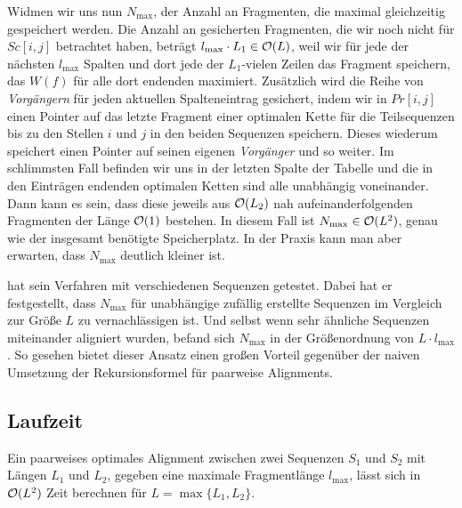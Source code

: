 Widmen wir uns nun $N_{\max}$, der Anzahl an Fragmenten, die maximal gleichzeitig gespeichert werden. Die Anzahl an gesicherten Fragmenten, die wir noch nicht für $Sc[i,j]$ betrachtet haben, beträgt $l_{\max} \cdot L_1 \in \mathcal{O}(L)$, weil wir für jede der nächsten $l_{\max}$ Spalten und dort jede der $L_1$-vielen Zeilen das Fragment speichern, das $W(f)$ für alle dort endenden maximiert. Zusätzlich wird die Reihe von \emph{Vorgängern} für jeden aktuellen Spalteneintrag gesichert, indem wir in $Pr[i,j]$ einen Pointer auf das letzte Fragment einer optimalen Kette für die Teilsequenzen bis zu den Stellen $i$ und $j$ in den beiden Sequenzen speichern. Dieses wiederum speichert einen Pointer auf seinen eigenen \emph{Vorgänger} und so weiter. Im schlimmsten Fall befinden wir uns in der letzten Spalte der Tabelle und die in den Einträgen endenden optimalen Ketten sind alle unabhängig voneinander. Dann kann es sein, dass diese jeweils aus $\mathcal{O}(L_2)$ nah aufeinanderfolgenden Fragmenten der Länge $\mathcal{O}(1)$ bestehen. In diesem Fall ist $N_{\max} \in \mathcal{O}(L^2)$, genau wie der insgesamt benötigte Speicherplatz. In der Praxis kann man aber erwarten, dass $N_{\max}$ deutlich kleiner ist. 

\cite{m02} hat sein Verfahren mit verschiedenen Sequenzen getestet. Dabei hat er festgestellt, dass $N_{\max}$ für unabhängige zufällig erstellte Sequenzen im Vergleich zur Größe $L$ zu vernachlässigen ist. Und selbst wenn sehr ähnliche Sequenzen miteinander aligniert wurden, befand sich $N_{\max}$ in der Größenordnung von $L \cdot l_{\max}$. So gesehen bietet dieser Ansatz einen großen Vorteil gegenüber der naiven Umsetzung der Rekursionsformel für paarweise Alignments.

\subsection{Laufzeit}

\begin{satz}
	Ein paarweises optimales Alignment zwischen zwei Sequenzen $S_1$ und $S_2$ mit Längen $L_1$ und $L_2$, gegeben eine maximale Fragmentlänge $l_{\max}$, lässt sich in $\mathcal{O}(L^2)$ Zeit berechnen für $L = \max\{L_1, L_2\}$.
\end{satz}

